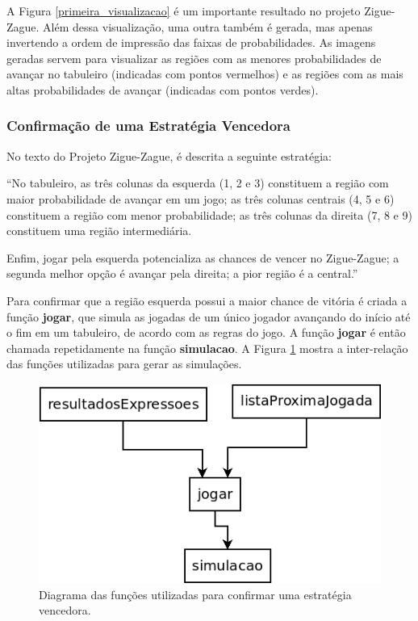 \documentclass[12pt]{article}
\newcommand{\aspas}[1]{``#1''} %
\newcommand{\citacao}[1]{
	\singlespacing %
	\begin{flushright}
		\begin{minipage}{0.75\linewidth} %
			{\fontsize{10}{\baselineskip}\selectfont \aspas{#1}}
		\end{minipage}
	\end{flushright}
	\onehalfspacing %
}
\begin{document}
A Figura \ref{primeira_visualizacao} é um importante resultado no projeto Zigue-Zague. Além dessa visualização, uma outra também é gerada, mas apenas invertendo a ordem de impressão das faixas de probabilidades. As imagens geradas servem para visualizar as regiões com as menores probabilidades de avançar no tabuleiro (indicadas com pontos vermelhos) e as regiões com as mais altas probabilidades de avançar (indicadas com pontos verdes).

\subsubsection{Confirmação de uma Estratégia Vencedora}

No texto do Projeto Zigue-Zague, é descrita a seguinte estratégia:

\citacao{No tabuleiro, as três colunas da esquerda (1, 2 e 3) constituem a região com maior probabilidade de avançar em um jogo; as três colunas centrais (4, 5 e 6) constituem a região com menor probabilidade; as três colunas da direita (7, 8 e 9) constituem uma região intermediária.

Enfim, jogar pela esquerda potencializa as chances de vencer no Zigue-Zague; a segunda melhor opção é avançar pela direita; a pior região é a central.}

Para confirmar que a região esquerda possui a maior chance de vitória é criada a função \textbf{jogar}, que simula as jogadas de um único jogador avançando do início até o fim em um tabuleiro, de acordo com as regras do jogo. A função \textbf{jogar} é então chamada repetidamente na função \textbf{simulacao}. A Figura \ref{confirmacao_regiao_vencedora} mostra a inter-relação das funções utilizadas para gerar as simulações.

\begin{figure}[ht]
	\centering
	\includegraphics[width=0.55\linewidth]{img/confirmacao_regiao_vencedora.png}
	\caption{Diagrama das funções utilizadas para confirmar uma estratégia vencedora.}
	\label{confirmacao_regiao_vencedora}
\end{figure}
\end{document}
